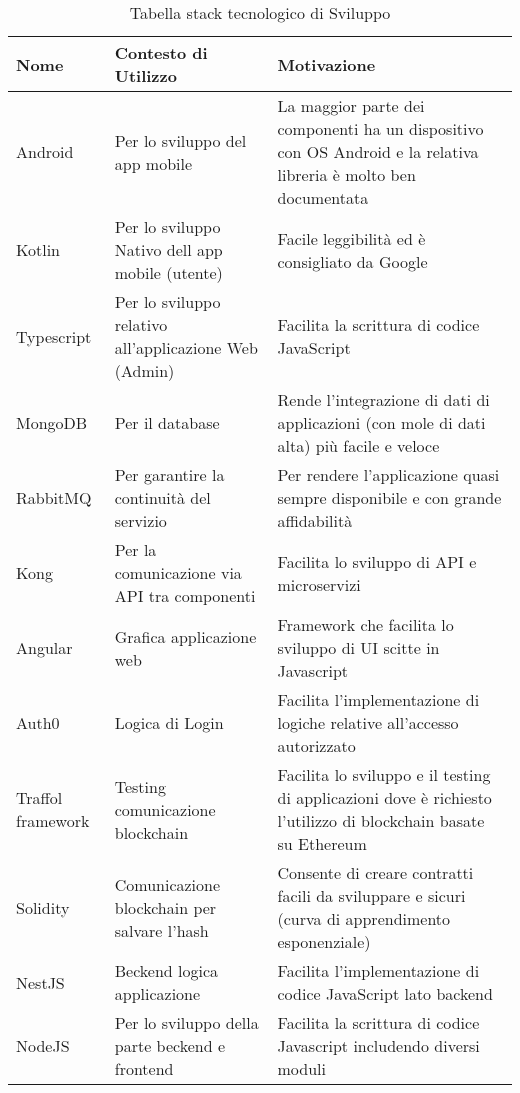     \begin{longtable}{ C{5cm} C{4cm} C{5cm} }
        \caption{Tabella stack tecnologico di Sviluppo}                                                                                 \\
        \rowcolor{\primaryColor}
        \textcolor{\secondaryColor}{\textbf{Nome}} & \textcolor{\secondaryColor}{\textbf{Contesto di Utilizzo}} & \textcolor{\secondaryColor}{\textbf{Motivazione}}\\ \endhead
        {Android} & {Per lo sviluppo del app mobile}   & {La maggior parte dei componenti ha un dispositivo con OS Android e la relativa libreria è molto ben documentata}\\
        {Kotlin} & {Per lo sviluppo Nativo dell app mobile (utente)} & {Facile leggibilità ed è consigliato da Google} \\
        {Typescript} & {Per lo sviluppo relativo all'applicazione Web (Admin)} & { Facilita la scrittura di codice JavaScript } \\
        {MongoDB} & {Per il database} & { Rende l'integrazione di dati di applicazioni (con mole di dati alta) più facile e veloce} \\
        {RabbitMQ} & {Per garantire la continuità del servizio} & {Per rendere l'applicazione quasi sempre disponibile e con grande affidabilità} \\
        {Kong} & {Per la comunicazione via API tra componenti} & {Facilita lo sviluppo di API e microservizi} \\
        {Angular} & {Grafica applicazione web} & {Framework che facilita lo sviluppo di UI scitte in Javascript} \\
        {Auth0} & {Logica di Login} & {Facilita l'implementazione di logiche relative all'accesso autorizzato} \\
        {Traffol framework} & {Testing comunicazione blockchain} & {Facilita lo sviluppo e il testing di applicazioni dove è richiesto l'utilizzo di blockchain basate su Ethereum} \\
        {Solidity} & {Comunicazione blockchain per salvare l'hash} & {Consente di creare contratti facili da sviluppare e sicuri (curva di apprendimento esponenziale)} \\
        {NestJS} & {Beckend logica applicazione} & {Facilita l'implementazione di codice JavaScript lato backend} \\
        {NodeJS} & {Per lo sviluppo della parte beckend e frontend} & {Facilita la scrittura di codice Javascript includendo diversi moduli} \\
    \end{longtable}
    
